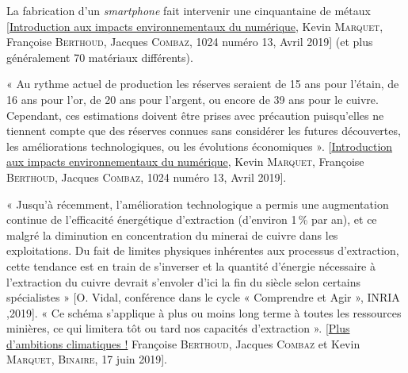 \begin{jazzitemize}
\item La fabrication d’un \textit{smartphone} fait intervenir une cinquantaine de métaux [\href{https://www.societe-informatique-de-france.fr/wp-content/uploads/2019/04/1024-numero-13_Article19.pdf}{Introduction aux impacts environnementaux du numérique}, Kevin \textsc{Marquet}, Françoise \textsc{Berthoud}, Jacques \textsc{Combaz}, 1024 numéro 13, Avril 2019] (et plus généralement 70 matériaux différents).
\item « Au rythme actuel de production les réserves seraient de 15 ans pour l’étain, de 16 ans pour l’or, de 20 ans pour l’argent, ou encore de 39 ans pour le cuivre. Cependant, ces estimations doivent être prises avec précaution puisqu’elles ne tiennent compte que des réserves connues sans considérer les futures découvertes, les améliorations technologiques, ou les évolutions économiques ». [\href{https://www.societe-informatique-de-france.fr/wp-content/uploads/2019/04/1024-numero-13_Article19.pdf}{Introduction aux impacts environnementaux du numérique}, Kevin \textsc{Marquet}, Françoise \textsc{Berthoud}, Jacques \textsc{Combaz}, 1024 numéro 13, Avril 2019].
\item « Jusqu’à récemment, l’amélioration technologique a permis une augmentation continue de l’efficacité énergétique d’extraction (d’environ 1\,\% par an), et ce malgré la diminution en concentration du minerai de cuivre dans les exploitations. Du fait de limites physiques inhérentes aux processus d’extraction, cette tendance est en train de s’inverser et la quantité d’énergie nécessaire à l’extraction du cuivre devrait s’envoler d’ici la fin du siècle selon certains spécialistes » [O. Vidal, conférence dans le cycle « Comprendre et Agir », INRIA ,2019]. « Ce schéma s’applique à plus ou moins long terme à toutes les ressources minières, ce qui limitera tôt ou tard nos capacités d’extraction ». [\href{https://www.lemonde.fr/blog/binaire/2019/06/17/plus-d-ambitions-climatiques/}{Plus d’ambitions climatiques !} Françoise \textsc{Berthoud}, Jacques \textsc{Combaz} et Kevin \textsc{Marquet}, \textsc{Binaire}, 17 juin 2019].
\end{jazzitemize}

